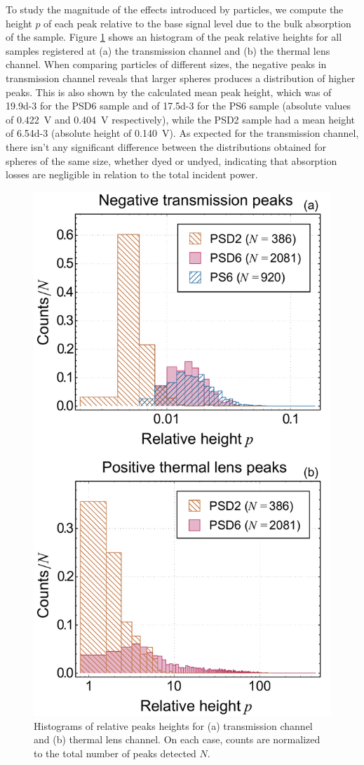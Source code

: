 \documentclass[9pt,twocolumn,twoside]{osajnl}
\begin{document}
To study the magnitude of the effects introduced by particles, we compute the height $p$ of each peak relative to the base signal level due to the bulk absorption of the sample. Figure \ref{fig:PeakHistogram} shows an histogram of the peak relative heights for all samples registered at (a) the transmission channel and (b) the thermal lens channel. When comparing particles of different sizes, the negative peaks in transmission channel reveals that larger spheres produces a distribution of higher peaks. This is also shown by the calculated mean peak height, which was of \SI{19.9d-3}{} for the PSD6 sample and of \SI{17.5d-3}{} for the PS6 sample (absolute values of \SI{0.422}{\volt} and \SI{0.404}{\volt} respectively), while the PSD2 sample had a mean height of \SI{6.54d-3}{} (absolute height of \SI{0.140}{\volt}). As expected for the transmission channel, there isn't any significant difference between the distributions obtained for spheres of the same size, whether dyed or undyed, indicating that absorption losses are negligible in relation to the total incident power.

\begin{figure}[t!]
	\centering \includegraphics[width=.49\textwidth]{figures/PeakHeightDistribution.pdf}
	\caption{Histograms of relative peaks heights for (a) transmission channel and (b) thermal lens channel. On each case, counts are normalized to the total number of peaks detected $N$.}
	\label{fig:PeakHistogram}
\end{figure}
\end{document}
